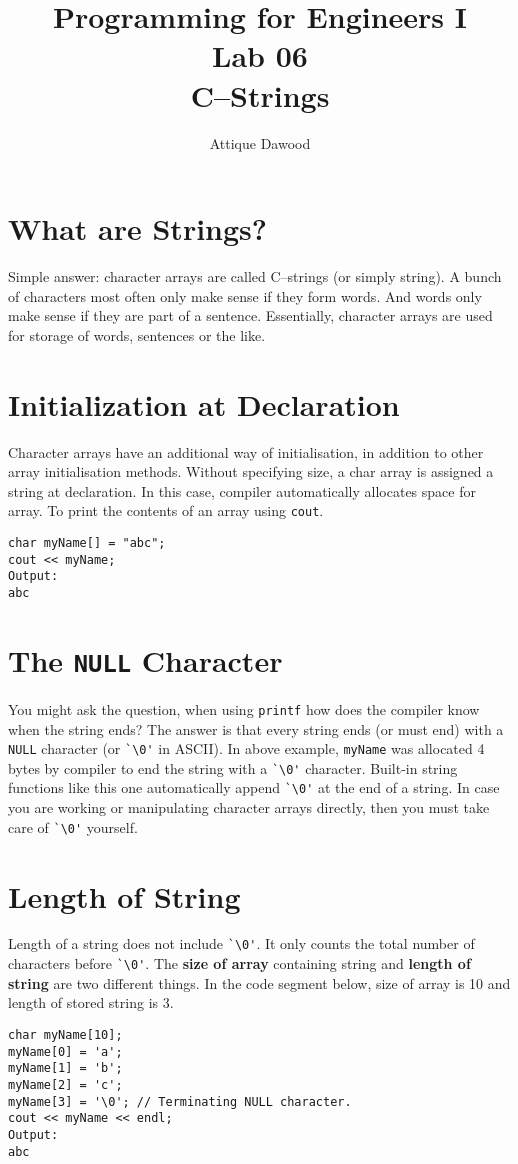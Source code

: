 \documentclass[12pt,a4paper]{article}
\title{Programming for Engineers I\\Lab 06\\C--Strings}
\author{Attique Dawood}
\begin{document}
\maketitle
\section{What are Strings?}
Simple answer: character arrays are called C--strings (or simply string). A bunch of characters most often only make sense if they form words. And words only make sense if they are part of a sentence. Essentially, character arrays are used for storage of words, sentences or the like.
\section{Initialization at Declaration}
Character arrays have an additional way of initialisation, in addition to other array initialisation methods. Without specifying size, a char array is assigned a string at declaration. In this case, compiler automatically allocates space for array. To print the contents of an array using \texttt{cout}.
\begin{lstlisting}
char myName[] = "abc";
cout << myName;
Output:
abc
\end{lstlisting}
\section{The \texttt{NULL} Character}
You might ask the question, when using \texttt{printf} how does the compiler know when the string ends? The answer is that every string ends (or must end) with a \texttt{NULL} character (or \verb|`\0'| in ASCII). In above example, \texttt{myName} was allocated 4 bytes by compiler to end the string with a \verb|`\0'| character. Built-in string functions like this one automatically append \verb|`\0'| at the end of a string. In case you are working or manipulating character arrays directly, then you must take care of \verb|`\0'| yourself.
\section{Length of String}
Length of a string does not include \verb|`\0'|. It only counts the total number of characters before \verb|`\0'|. The \textbf{size of array} containing string and \textbf{length of string} are two different things. In the code segment below, size of array is 10 and length of stored string is 3.
\begin{lstlisting}
char myName[10];
myName[0] = 'a';
myName[1] = 'b';
myName[2] = 'c';
myName[3] = '\0'; // Terminating NULL character.
cout << myName << endl;
Output:
abc
\end{lstlisting}
\end{document}
